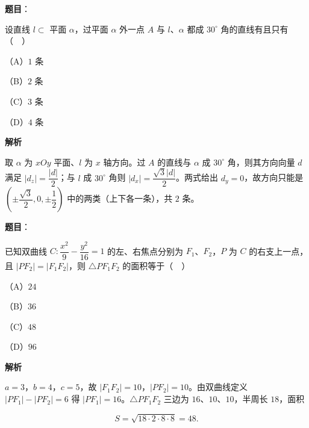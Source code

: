 \begin{answer}

\textbf{题目}：

设直线 $l\subset$ 平面 $\alpha$，过平面 $\alpha$ 外一点 $A$ 与 $l$、$\alpha$ 都成 $30^\circ$ 角的直线有且只有（　）

（A）$1$ 条

（B）$2$ 条

（C）$3$ 条

（D）$4$ 条

\textbf{解析}

取 $\alpha$ 为 $xOy$ 平面、$l$ 为 $x$ 轴方向。过 $A$ 的直线与 $\alpha$ 成 $30^\circ$ 角，则其方向向量 $d$ 满足 $|d_z|=\dfrac{|d|}2$；与 $l$ 成 $30^\circ$ 角则 $|d_x|=\dfrac{\sqrt3|d|}2$。两式给出 $d_y=0$，故方向只能是 $\left(\pm\dfrac{\sqrt3}2,0,\pm\dfrac12\right)$ 中的两类（上下各一条），共 $2$ 条。


\end{answer}
\begin{answer}

\textbf{题目}：

已知双曲线 $C:\dfrac{x^2}9-\dfrac{y^2}{16}=1$ 的左、右焦点分别为 $F_1$、$F_2$，$P$ 为 $C$ 的右支上一点，且 $|PF_2|=|F_1F_2|$，则 $\triangle PF_1F_2$ 的面积等于（　）

（A）$24$

（B）$36$

（C）$48$

（D）$96$

\textbf{解析}

$a=3$，$b=4$，$c=5$，故 $|F_1F_2|=10$，$|PF_2|=10$。由双曲线定义 $|PF_1|-|PF_2|=6$ 得 $|PF_1|=16$。$\triangle PF_1F_2$ 三边为 $16$、$10$、$10$，半周长 $18$，面积

\nopagebreak[4]
\[S=\sqrt{18\cdot2\cdot8\cdot8}=48.\]


\end{answer}
